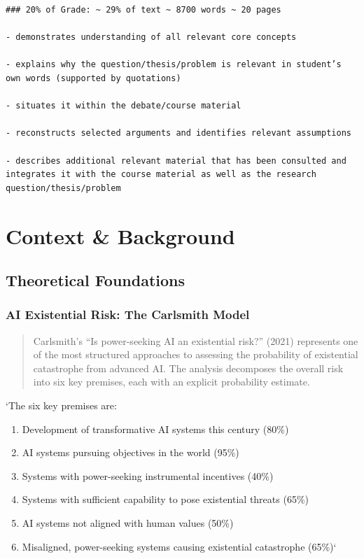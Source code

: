 \documentclass[]{book}
\providecommand{\tightlist}{%
  \setlength{\itemsep}{0pt}\setlength{\parskip}{0pt}}
\begin{document}
\begin{verbatim}
### 20% of Grade: ~ 29% of text ~ 8700 words ~ 20 pages

- demonstrates understanding of all relevant core concepts

- explains why the question/thesis/problem is relevant in student’s own words (supported by quotations)

- situates it within the debate/course material

- reconstructs selected arguments and identifies relevant assumptions

- describes additional relevant material that has been consulted and integrates it with the course material as well as the research question/thesis/problem
\end{verbatim}


\chapter{Context \& Background}\label{sec-context-background}

\section{Theoretical Foundations}\label{sec-theoretical-foundations}

\subsection{AI Existential Risk: The Carlsmith
Model}\label{sec-carlsmith-model}

\begin{quote}
Carlsmith's ``Is power-seeking AI an existential risk?'' (2021)
represents one of the most structured approaches to assessing the
probability of existential catastrophe from advanced AI. The analysis
decomposes the overall risk into six key premises, each with an explicit
probability estimate.
\end{quote}

`The six key premises are:

\begin{enumerate}
\def\labelenumi{\arabic{enumi}.}
\tightlist
\item
  Development of transformative AI systems this century (80\%)
\item
  AI systems pursuing objectives in the world (95\%)
\item
  Systems with power-seeking instrumental incentives (40\%)
\item
  Systems with sufficient capability to pose existential threats (65\%)
\item
  AI systems not aligned with human values (50\%)
\item
  Misaligned, power-seeking systems causing existential catastrophe
  (65\%)`
\end{enumerate}
\end{document}
